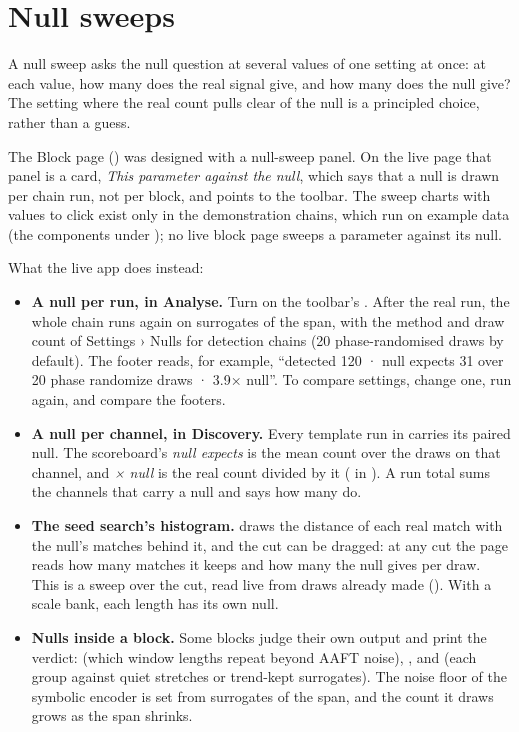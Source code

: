 \section{Null sweeps}\label{sec:nulls-sweeps}
\begin{plainterms}
A null sweep asks the null question at several values of one setting at once: at each value,
how many does the real signal give, and how many does the null give? The setting where the
real count pulls clear of the null is a principled choice, rather than a guess.
\end{plainterms}

The Block page () was designed with a null-sweep panel. On the live
page that panel is a card, \emph{This parameter against the null}, which says that a null is
drawn per chain run, not per block, and points to the toolbar. The sweep charts with values to
click exist only in the demonstration chains, which run on example data (the components under
); no live block page sweeps a parameter against its null.

What the live app does instead:
\begin{itemize}
\item \textbf{A null per run, in Analyse.} Turn on the toolbar's . After the
  real run, the whole chain runs again on surrogates of the span, with the method and draw
  count of Settings › Nulls for detection chains (20 phase-randomised draws by default). The
  footer reads, for example, ``detected 120 · null expects 31 over 20 phase randomize draws ·
  3.9× null''. To compare settings, change one, run again, and compare the footers.
\item \textbf{A null per channel, in Discovery.} Every template run in
   carries its paired null. The scoreboard's \emph{null expects} is
  the mean count over the draws on that channel, and \emph{× null} is the real count divided
  by it ( in ). A run total sums the
  channels that carry a null and says how many do.
\item \textbf{The seed search's histogram.}  draws the distance of each
  real match with the null's matches behind it, and the cut can be dragged: at any cut the page
  reads how many matches it keeps and how many the null gives per draw. This is a sweep over
  the cut, read live from draws already made (). With a scale bank, each
  length has its own null.
\item \textbf{Nulls inside a block.} Some blocks judge their own output and print the verdict:
   (which window lengths repeat beyond AAFT noise),
  ,  and
   (each group against quiet stretches or trend-kept
  surrogates). The noise floor of the symbolic encoder  is set
  from surrogates of the span, and the count it draws grows as the span shrinks.
\end{itemize}

